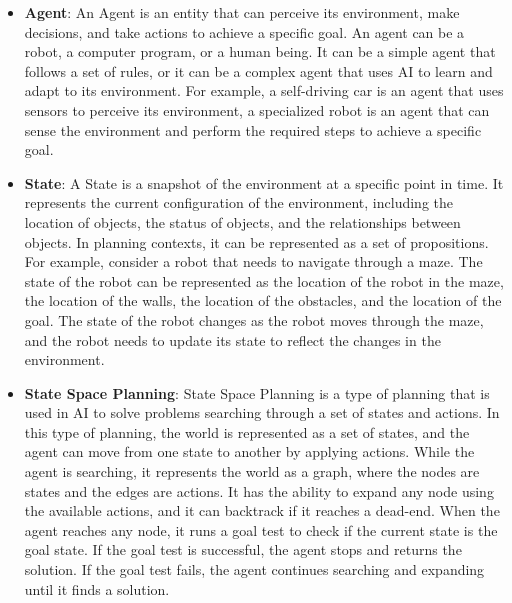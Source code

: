 \begin{itemize}
    \item \textbf{Agent}: An Agent is an entity that can perceive its environment, make decisions, and take actions to achieve a specific goal. An agent can be a robot, a computer program, or a human being. It can be a simple agent that follows a set of rules, or it can be a complex agent that uses \ac{AI} to learn and adapt to its environment. For example, a self-driving car is an agent that uses sensors to perceive its environment, a specialized robot is an agent that can sense the environment and perform the required steps to achieve a specific goal.

    \item \textbf{State}: A State is a snapshot of the environment at a specific point in time. It represents the current configuration of the environment, including the location of objects, the status of objects, and the relationships between objects. In planning contexts, it can be represented as a set of propositions. For example, consider a robot that needs to navigate through a maze. The state of the robot can be represented as the location of the robot in the maze, the location of the walls, the location of the obstacles, and the location of the goal. The state of the robot changes as the robot moves through the maze, and the robot needs to update its state to reflect the changes in the environment.

    \item \label{def:state_space_planning}
          \textbf{State Space Planning}: State Space Planning is a type of planning that is used in \ac{AI} to solve problems searching through a set of states and actions. In this type of planning, the world is represented as a set of states, and the agent can move from one state to another by applying actions. While the agent is searching, it represents the world as a graph, where the nodes are states and the edges are actions. It has the ability to expand any node using the available actions, and it can backtrack if it reaches a dead-end. When the agent reaches any node, it runs a goal test to check if the current state is the goal state. If the goal test is successful, the agent stops and returns the solution. If the goal test fails, the agent continues searching and expanding until it finds a solution.


\end{itemize}
